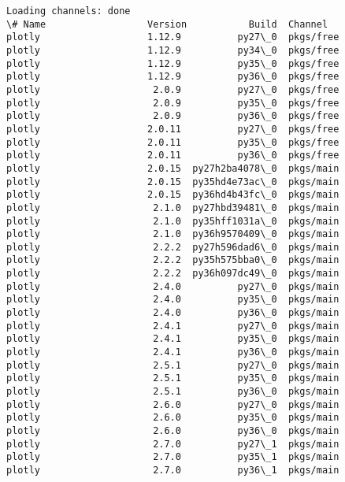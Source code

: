 \documentclass[11pt]{article}
\begin{document}
    \begin{Verbatim}[commandchars=\\\{\}]
Loading channels: done
\# Name                  Version           Build  Channel             
plotly                   1.12.9          py27\_0  pkgs/free           
plotly                   1.12.9          py34\_0  pkgs/free           
plotly                   1.12.9          py35\_0  pkgs/free           
plotly                   1.12.9          py36\_0  pkgs/free           
plotly                    2.0.9          py27\_0  pkgs/free           
plotly                    2.0.9          py35\_0  pkgs/free           
plotly                    2.0.9          py36\_0  pkgs/free           
plotly                   2.0.11          py27\_0  pkgs/free           
plotly                   2.0.11          py35\_0  pkgs/free           
plotly                   2.0.11          py36\_0  pkgs/free           
plotly                   2.0.15  py27h2ba4078\_0  pkgs/main           
plotly                   2.0.15  py35hd4e73ac\_0  pkgs/main           
plotly                   2.0.15  py36hd4b43fc\_0  pkgs/main           
plotly                    2.1.0  py27hbd39481\_0  pkgs/main           
plotly                    2.1.0  py35hff1031a\_0  pkgs/main           
plotly                    2.1.0  py36h9570409\_0  pkgs/main           
plotly                    2.2.2  py27h596dad6\_0  pkgs/main           
plotly                    2.2.2  py35h575bba0\_0  pkgs/main           
plotly                    2.2.2  py36h097dc49\_0  pkgs/main           
plotly                    2.4.0          py27\_0  pkgs/main           
plotly                    2.4.0          py35\_0  pkgs/main           
plotly                    2.4.0          py36\_0  pkgs/main           
plotly                    2.4.1          py27\_0  pkgs/main           
plotly                    2.4.1          py35\_0  pkgs/main           
plotly                    2.4.1          py36\_0  pkgs/main           
plotly                    2.5.1          py27\_0  pkgs/main           
plotly                    2.5.1          py35\_0  pkgs/main           
plotly                    2.5.1          py36\_0  pkgs/main           
plotly                    2.6.0          py27\_0  pkgs/main           
plotly                    2.6.0          py35\_0  pkgs/main           
plotly                    2.6.0          py36\_0  pkgs/main           
plotly                    2.7.0          py27\_1  pkgs/main           
plotly                    2.7.0          py35\_1  pkgs/main           
plotly                    2.7.0          py36\_1  pkgs/main           

\end{Verbatim}
\end{document}
